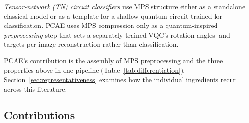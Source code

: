 \documentclass[pdflatex,sn-basic]{sn-jnl}
\begin{document}
\emph{Tensor-network (TN) circuit classifiers}
\citep{Guala2023, Stoudenmire2016, Han2018} use MPS structure either as a
standalone classical model or as a template for a shallow quantum circuit trained
for classification. PCAE uses MPS compression only as a quantum-inspired
\emph{preprocessing} step that sets a separately trained VQC's rotation angles,
and targets per-image reconstruction rather than classification.

PCAE's contribution is the assembly of MPS preprocessing and the three properties above in one pipeline
(Table~\ref{tab:differentiation}). Section~\ref{sec:representativeness} examines
how the individual ingredients recur across this literature.

\subsection*{Contributions}
\end{document}
